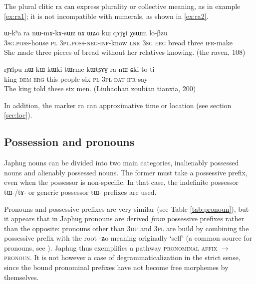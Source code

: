 \documentclass[oldfontcommands,oneside,a4paper,11pt]{article}
\newcommand{\ipa}[1]{\mbox{\phon #1}} %
\begin{document}
  The plural clitic \ipa{ra} can express plurality or collective meaning, as in example \ref{ex:ra1}; it is not incompatible with numerals, as shown in \ref{ex:ra2}.
 
\begin{exe}
\ex \label{ex:ra1}
\gll \ipa{ɯ-kʰa} 	\ipa{ra} 	\ipa{nɯ-mɤ-kɤ-sɯz} 	\ipa{nɤ} 	\ipa{ɯʑo} 	\ipa{kɯ} 	\ipa{qɤjɣi} 	\ipa{χsɯm} 	\ipa{lo-βzu} \\
\textsc{3sg.poss}-house \textsc{pl} \textsc{3pl.poss-neg-inf}-know \textsc{lnk} \textsc{3sg} \textsc{erg} bread three \textsc{ifr}-make \\
\glt She made three pieces of bread without her relatives knowing. (the raven, 108)
\end{exe}

\begin{exe}
\ex \label{ex:ra2}
\gll 
 \ipa{rɟɤlpu} 	\ipa{nɯ} 	\ipa{kɯ} 	\ipa{kɯki} 	\ipa{tɯrme} 	\ipa{kɯtʂɤɣ} 	\ipa{ra} 	\ipa{nɯ-ɕki}  	\ipa{to-ti} \\
 king \textsc{dem} \textsc{erg} this people six \textsc{pl} \textsc{3pl-dat} \textsc{ifr}-say  \\
 \glt The king told these six men. (Liuhaohan zoubian tianxia, 200)
\end{exe}

In addition, the marker \ipa{ra} can approximative time or location  (see section  \ref{sec:loc}).
 


 \subsection{Possession and pronouns} \label{sec:pronouns}
 
Japhug  nouns can be divided into two main categories, inalienably possessed nouns and alienably possessed nouns. The former must take a possessive prefix, even when the possessor is non-specific. In that case, the indefinite possessor \ipa{tɯ-/tɤ-} or generic possessor \ipa{tɯ-} prefixes are used.

Pronouns  and possessive prefixes are very similar (see Table \ref{tab:pronoun}), but it appears that in Japhug pronouns are derived \textit{from} possessive prefixes rather than the opposite: pronouns other than \textsc{3du} and \textsc{3pl} are build by combining the possessive prefix with the root \ipa{-ʑo} meaning originally `self' (a common source for pronouns, see \citealt{heine11pronoms}). Japhug thus exemplifies a pathway \textsc{pronominal affix} $\rightarrow$ \textsc{pronoun}. It is not however a case of degrammaticalization in the strict sense, since the bound pronominal prefixes have not become free morphemes by themselves.
\end{document}
